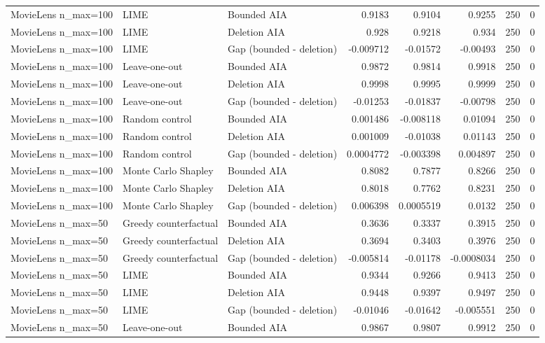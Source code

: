 \begin{table}[t]
{\begin{tabular}{lllrrrrr}
MovieLens n\_max=100 & LIME & Bounded AIA & 0.9183 & 0.9104 & 0.9255 & 250 & 0 \\
MovieLens n\_max=100 & LIME & Deletion AIA & 0.928 & 0.9218 & 0.934 & 250 & 0 \\
MovieLens n\_max=100 & LIME & Gap (bounded - deletion) & -0.009712 & -0.01572 & -0.00493 & 250 & 0 \\
MovieLens n\_max=100 & Leave-one-out & Bounded AIA & 0.9872 & 0.9814 & 0.9918 & 250 & 0 \\
MovieLens n\_max=100 & Leave-one-out & Deletion AIA & 0.9998 & 0.9995 & 0.9999 & 250 & 0 \\
MovieLens n\_max=100 & Leave-one-out & Gap (bounded - deletion) & -0.01253 & -0.01837 & -0.00798 & 250 & 0 \\
MovieLens n\_max=100 & Random control & Bounded AIA & 0.001486 & -0.008118 & 0.01094 & 250 & 0 \\
MovieLens n\_max=100 & Random control & Deletion AIA & 0.001009 & -0.01038 & 0.01143 & 250 & 0 \\
MovieLens n\_max=100 & Random control & Gap (bounded - deletion) & 0.0004772 & -0.003398 & 0.004897 & 250 & 0 \\
MovieLens n\_max=100 & Monte Carlo Shapley & Bounded AIA & 0.8082 & 0.7877 & 0.8266 & 250 & 0 \\
MovieLens n\_max=100 & Monte Carlo Shapley & Deletion AIA & 0.8018 & 0.7762 & 0.8231 & 250 & 0 \\
MovieLens n\_max=100 & Monte Carlo Shapley & Gap (bounded - deletion) & 0.006398 & 0.0005519 & 0.0132 & 250 & 0 \\
MovieLens n\_max=50 & Greedy counterfactual & Bounded AIA & 0.3636 & 0.3337 & 0.3915 & 250 & 0 \\
MovieLens n\_max=50 & Greedy counterfactual & Deletion AIA & 0.3694 & 0.3403 & 0.3976 & 250 & 0 \\
MovieLens n\_max=50 & Greedy counterfactual & Gap (bounded - deletion) & -0.005814 & -0.01178 & -0.0008034 & 250 & 0 \\
MovieLens n\_max=50 & LIME & Bounded AIA & 0.9344 & 0.9266 & 0.9413 & 250 & 0 \\
MovieLens n\_max=50 & LIME & Deletion AIA & 0.9448 & 0.9397 & 0.9497 & 250 & 0 \\
MovieLens n\_max=50 & LIME & Gap (bounded - deletion) & -0.01046 & -0.01642 & -0.005551 & 250 & 0 \\
MovieLens n\_max=50 & Leave-one-out & Bounded AIA & 0.9867 & 0.9807 & 0.9912 & 250 & 0 \\

\end{tabular}}
\end{table}

